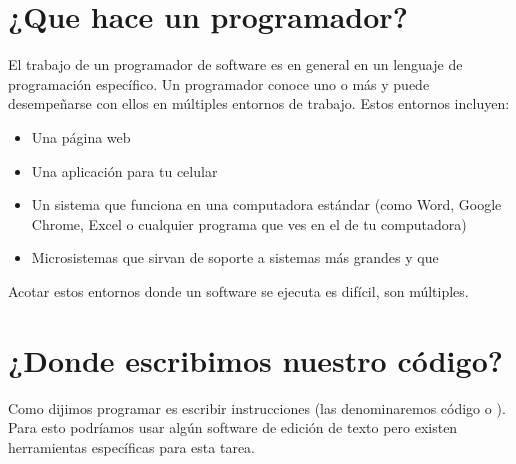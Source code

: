 \documentclass[a5paper,9pt,spanish]{sphinxmanual}
\begin{document}
\sphinxstepscope


\chapter{¿Que hace un programador?}
\label{\detokenize{hace:que-hace-un-programador}}\label{\detokenize{hace::doc}}
\sphinxAtStartPar
El trabajo de un programador de software es en general
 en un lenguaje de programación específico.
Un programador conoce uno o más  y puede desempeñarse con ellos en
múltiples entornos de trabajo.
Estos entornos incluyen:
\begin{itemize}
\item {} 
\sphinxAtStartPar
Una página web

\item {} 
\sphinxAtStartPar
Una aplicación para tu celular

\item {} 
\sphinxAtStartPar
Un sistema que funciona en una computadora estándar (como Word, Google Chrome, Excel o
cualquier programa que ves en el  de tu computadora)

\item {} 
\sphinxAtStartPar
Micro\sphinxhyphen{}sistemas que sirvan de soporte a sistemas más grandes y que 

\end{itemize}

\sphinxAtStartPar
Acotar estos entornos donde un software se ejecuta es difícil, son múltiples.

\noindent{}

\sphinxstepscope


\chapter{¿Donde escribimos nuestro código?}
\label{\detokenize{donde:donde-escribimos-nuestro-codigo}}\label{\detokenize{donde::doc}}
\sphinxAtStartPar
Como dijimos programar es escribir instrucciones (las denominaremos código o ). Para esto podríamos usar algún
software de edición de texto pero existen herramientas específicas para esta tarea.

\sphinxAtStartPar
{}%
\begin{footnote}[1]\sphinxAtStartFootnote
{}
%
\end{footnote}
\end{document}
